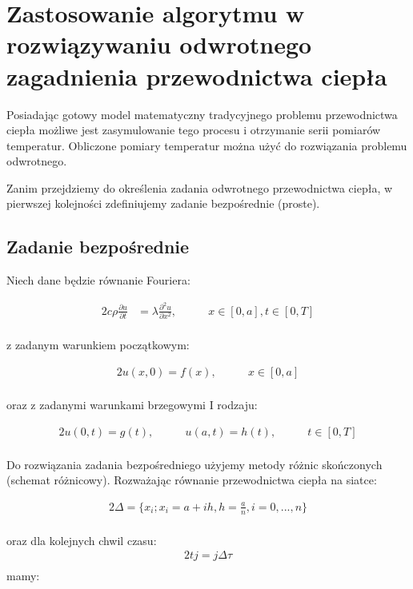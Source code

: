 \documentclass[twoside]{projektInzynierskiMS1}
\newcommand{\si}{ś}
\begin{document}
\section{Zastosowanie algorytmu w rozwiązywaniu odwrotnego zagadnienia przewodnictwa ciepła}
Posiadając gotowy model matematyczny tradycyjnego problemu przewodnictwa ciepła możliwe jest zasymulowanie tego procesu i otrzymanie serii pomiarów temperatur. Obliczone pomiary temperatur można użyć do rozwiązania problemu odwrotnego. 


Zanim przejdziemy do określenia zadania odwrotnego przewodnictwa ciepła, w pierwszej kolejności zdefiniujemy zadanie bezpośrednie (proste).

\subsection{Zadanie bezpo\si rednie}
Niech dane będzie równanie Fouriera:

\begin{alignat*}{2}
c\rho \frac{\partial u}{\partial t}&= \lambda \frac{\partial^2 u}{\partial x^2},&\qquad  x \in [0, a], t \in [0, T]\\
\end{alignat*}


z zadanym warunkiem początkowym:

\begin{alignat*}{2}
u(x, 0) = f(x),&\qquad  x \in [0, a]\\
\end{alignat*}


oraz z zadanymi warunkami brzegowymi I rodzaju:

\begin{alignat*}{2}
u(0,t) = g(t),&\qquad  u(a, t) = h(t), &\qquad t \in [0, T]\\
\end{alignat*}


Do rozwiązania zadania bezpośredniego użyjemy metody różnic skończonych (schemat różnicowy).
Rozważając równanie przewodnictwa ciepła na siatce:

\begin{alignat*}{2}
\Delta = \{ x_i; x_i = a + ih, h = \frac{a}{n},  i=0, ..., n\}\\
\end{alignat*}

oraz dla kolejnych chwil czasu:
\begin{alignat*}{2}
tj = j \Delta \tau\\
\end{alignat*}
mamy:
\end{document}
